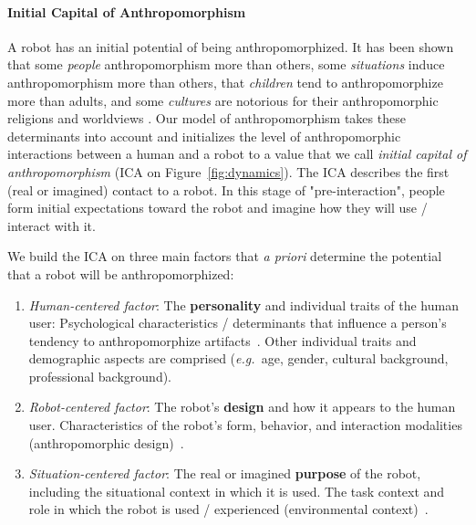 \documentclass{acm_proc_article-sp}
\newcommand{\eg}{{\textit{e.g.~}}}
\begin{document}
\paragraph{Initial Capital of Anthropomorphism}
\label{sec:ica}

A robot has an initial potential of being anthropomorphized. It has been shown
that some \textit{people} anthropomorphism more than others, some
\textit{situations} induce anthropomorphism more than others, that
\textit{children} tend to anthropomorphize more than adults, and some
\textit{cultures} are notorious for their anthropomorphic religions and
worldviews \cite{epley_when_2008}. Our model of anthropomorphism takes these
determinants into account and initializes the level of anthropomorphic
interactions between a human and a robot to a value that we call
\textit{initial capital of anthropomorphism} (ICA on
Figure~\ref{fig:dynamics}). The ICA describes the first (real or imagined)
contact to a robot. In this stage of "pre-interaction", people form initial
expectations toward the robot and imagine how they will use / interact with it.

We build the ICA on three main factors that \textit{a priori} determine the
potential that a robot will be anthropomorphized:

\begin{enumerate}

    \item \emph{Human-centered factor}: The \textbf{personality} and individual
        traits of the human user: Psychological characteristics / determinants
        that influence a person's tendency to anthropomorphize
        artifacts~\cite{epley_seeing_2007}. Other individual traits and
        demographic aspects are comprised (\eg age, gender, cultural
        background, professional background).
	
    \item \emph{Robot-centered factor}: The robot's \textbf{design} and how it
        appears to the human user. Characteristics of the robot's form,
        behavior, and interaction modalities (anthropomorphic
        design)~\cite{fong_survey_2003}.
	
    \item \emph{Situation-centered factor}: The real or imagined
        \textbf{purpose} of the robot, including the situational context in
        which it is used. The task context and role in which the robot is used
        / experienced (environmental context)~\cite{joosse_what_2013}.

\end{enumerate}	
\end{document}
